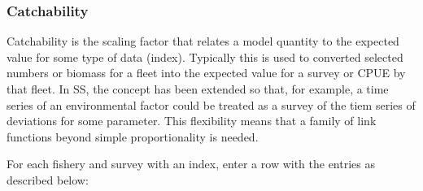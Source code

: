 \subsubsection{Catchability}
Catchability is the scaling factor that relates a model quantity to the expected value for some type of data (index).  Typically this is used to converted selected numbers or biomass for a fleet into the expected value for a survey or CPUE by that fleet.  In SS, the concept has been extended so that, for example, a time series of an environmental factor could be treated as a survey of the tiem series of deviations for some parameter.  This flexibility means that a family of link functions beyond simple proportionality is needed.

For each fishery and survey with an index, enter a row with the entries as described below:

